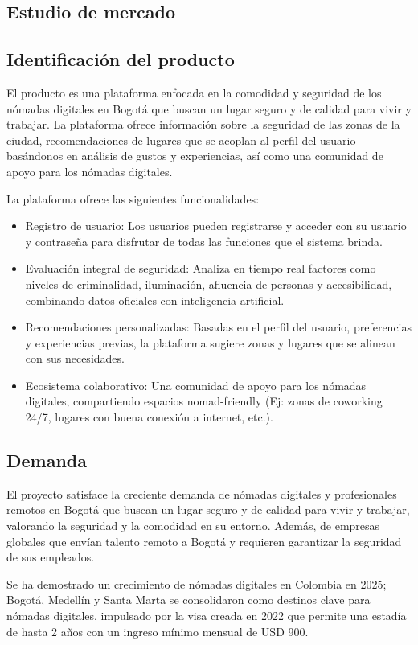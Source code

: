 \subsection{Estudio de mercado}
\subsection*{Identificación del producto}
El producto es una plataforma enfocada en la comodidad y seguridad de los nómadas digitales en Bogotá que buscan un lugar seguro y de calidad para vivir y trabajar. La plataforma ofrece información sobre la seguridad de las zonas de la ciudad, recomendaciones de lugares que se acoplan al perfil del usuario basándonos en análisis de gustos y experiencias, así como una comunidad de apoyo para los nómadas digitales.

La plataforma ofrece las siguientes funcionalidades:
\begin{itemize}
    \item Registro de usuario: Los usuarios pueden registrarse y acceder con su usuario y contraseña para disfrutar de todas las funciones que el sistema brinda.
    \item Evaluación integral de seguridad: Analiza en tiempo real factores como niveles de criminalidad, iluminación, afluencia de personas y accesibilidad, combinando datos oficiales con inteligencia artificial.
    \item Recomendaciones personalizadas: Basadas en el perfil del usuario, preferencias y experiencias previas, la plataforma sugiere zonas y lugares que se alinean con sus necesidades.
    \item Ecosistema colaborativo: Una comunidad de apoyo para los nómadas digitales, compartiendo espacios nomad-friendly (Ej: zonas de coworking 24/7, lugares con buena conexión a internet, etc.).
\end{itemize}

\subsection*{Demanda}
El proyecto satisface la creciente demanda de nómadas digitales y profesionales remotos en Bogotá que buscan un lugar seguro y de calidad para vivir y trabajar, valorando la seguridad y la comodidad en su entorno. Además, de empresas globales que envían talento remoto a Bogotá y requieren garantizar la seguridad de sus empleados.

Se ha demostrado un crecimiento de nómadas digitales en Colombia en 2025; Bogotá, Medellín y Santa Marta se consolidaron como destinos clave para nómadas digitales, impulsado por la visa creada en 2022 que permite una estadía de hasta 2 años con un ingreso mínimo mensual de USD 900.\cite{crecimiento_nomadas_digitales}

